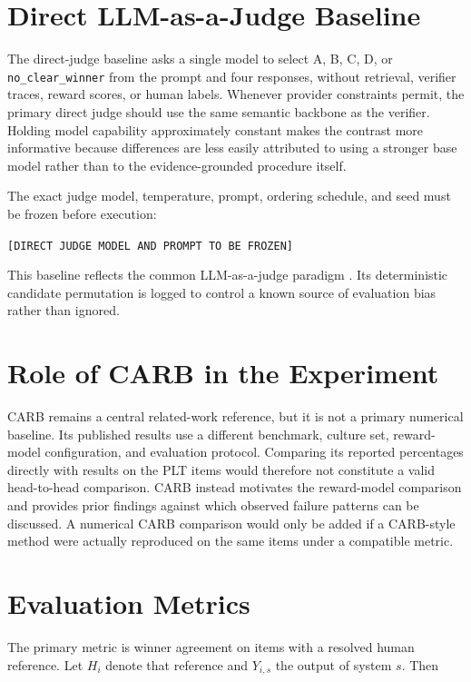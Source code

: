 \section{Direct LLM-as-a-Judge Baseline}

The direct-judge baseline asks a single model to select A, B, C, D, or \texttt{no\_clear\_winner} from the prompt and four responses, without retrieval, verifier traces, reward scores, or human labels. Whenever provider constraints permit, the primary direct judge should use the same semantic backbone as the verifier. Holding model capability approximately constant makes the contrast more informative because differences are less easily attributed to using a stronger base model rather than to the evidence-grounded procedure itself.

The exact judge model, temperature, prompt, ordering schedule, and seed must be frozen before execution:

\begin{center}
\texttt{[DIRECT JUDGE MODEL AND PROMPT TO BE FROZEN]}
\end{center}

This baseline reflects the common LLM-as-a-judge paradigm \parencite{zheng2023llmjudge}. Its deterministic candidate permutation is logged to control a known source of evaluation bias rather than ignored.

\section{Role of CARB in the Experiment}

CARB remains a central related-work reference, but it is not a primary numerical baseline. Its published results use a different benchmark, culture set, reward-model configuration, and evaluation protocol. Comparing its reported percentages directly with results on the PLT items would therefore not constitute a valid head-to-head comparison. CARB instead motivates the reward-model comparison and provides prior findings against which observed failure patterns can be discussed. A numerical CARB comparison would only be added if a CARB-style method were actually reproduced on the same items under a compatible metric.

\section{Evaluation Metrics}
\label{sec:evaluation-metrics}

The primary metric is winner agreement on items with a resolved human reference. Let $H_i$ denote that reference and $Y_{i,s}$ the output of system $s$. Then


